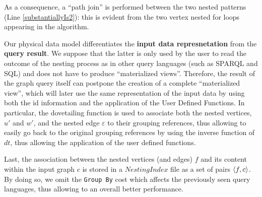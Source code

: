 As a consequence, a ``path join'' is performed between the two nested patterns (Line \ref{substantiallyIs2}): this is evident from the two vertex nested for loops appearing in the algorithm.  %



Our physical data model differentiates the \textbf{input data  represnetation} from the \textbf{query result}. 
We suppose that the latter is only used by the user to read the outcome of the nesting process as in other  query languages (such as SPARQL and SQL) and does not have to
produce ``materialized views''. Therefore, the result of the graph query itself can postpone the creation of a complete ``materialized view'', which will later use the same representation of the input data by using both the id information and the application of the User Defined Functions. In particular, the dovetailing function is used to associate both the nested vertices, $u'$ and $w'$, and the nested edge $\varepsilon$ to their grouping references, thus allowing to easily go back to the original grouping references by using the inverse function of $dt$, thus allowing the application of the user defined functions.


Last, the association between the nested vertices (and edges) $f$ and its content within the input graph $c$ is stored in a $NestingIndex$ file as a set of pairs $\Braket{f,c}$. By doing so, we omit the \texttt{Group By} cost which affects the previously seen query languages, thus allowing to an overall better performance. 



